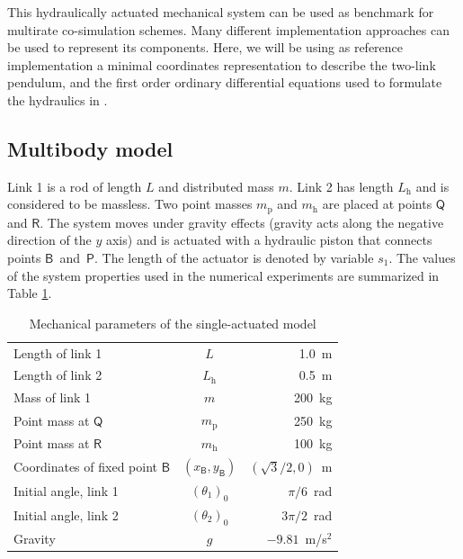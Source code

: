 \documentclass[fleqn,11pt]{article}
\renewcommand{\arraystretch}{1.136}
\newcommand{\point}[1]{ \mathsf{ #1 } }
\newcommand{\plbr}[1]{ \left( #1 \right) }
\begin{document}
This hydraulically actuated mechanical system can be used as benchmark for multirate co-simulation schemes.
Many different implementation approaches can be used to represent its components.
Here, we will be using as reference implementation a minimal coordinates representation to describe the two-link pendulum, and the first order ordinary differential equations used to formulate the hydraulics in \cite{Naya2011}. 

\subsection{Multibody model}
\label{MultibodyModel}

Link 1 is a rod of length $L$ and distributed mass $m$.
Link 2 has length $L_{\text{h}}$ and is considered to be massless.
Two point masses $m_{\text{p}}$ and $m_{\text{h}}$ are placed at points $\point{Q}$ and $\point{R}$.
The system moves under gravity effects (gravity acts along the negative direction of the $y$ axis) and is actuated with a hydraulic piston that connects points $\point{B}$~and~$\point{P}$.
The length of the actuator is denoted by variable $s_1$.
The values of the system properties used in the numerical experiments are summarized in Table \ref{tab:crane_parameters}.

\begin{table}[htbp]
\begin{center}
{
	\renewcommand{\arraystretch}{1.25}
	\begin{tabular}{lc@{\qquad}r}
		\hline
		Length of link 1     	 				& $L$                     & 1.0~m  \\
		Length of link 2 						& $L_{\text{h}}$          & 0.5~m  \\
		Mass of link 1                          & $m$                     & 200~kg \\
		Point mass at $\point{Q}$               & $m_{\text{p}}$          & 250~kg \\
		Point mass at $\point{R}$               & $m_{\text{h}}$          & 100~kg \\
		Coordinates of fixed point $\point{B}$  & $\plbr{x_{\point{B}},y_{\point{B}}}$  & $\plbr{\sqrt{3}/2, 0}$~m \\
		Initial angle, link 1                   & $\plbr{\theta_1}_0$     & $\pi/6$~rad \\
		Initial angle, link 2                   & $\plbr{\theta_2}_0$     & $3\pi/2$~rad \\
		Gravity                                 & $g$                     & $-9.81$~m/s$^2$ \\
		\hline
	\end{tabular}
}
\end{center}
\caption{Mechanical parameters of the single-actuated model}
\label{tab:crane_parameters}
\end{table}
\end{document}
